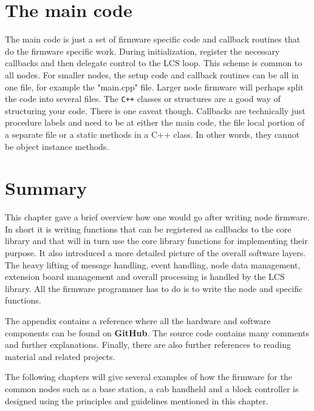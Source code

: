 \section{The main code}

The main code is just a set of firmware specific code and callback routines that do the firmware specific work. During initialization, register the necessary callbacks and then delegate control to the LCS loop. This scheme is common to all nodes. For smaller nodes, the setup code and callback routines can be all in one file, for example the "main.cpp" file. Larger node firmware will perhaps split the code into several files. The \texttt{C++} classes or structures are a good way of structuring your code. There is one caveat though. Callbacks are technically just procedure labels and need to be at either the main code, the file local portion of a separate file or a static methods in a C++ class. In other words, they cannot be object instance methods.

\section{Summary}

This chapter gave a brief overview how one would go after writing node firmware. In short it is writing functions that can be registered as callbacks to the core library and that will in turn use the core library functions for implementing their purpose. It also introduced a more detailed picture of the overall software layers. The heavy lifting of message handling, event handling, node data management, extension board management and overall processing is handled by the LCS library. All the firmware programmer has to do is to write the node and specific functions. 

The appendix contains a reference where all the hardware and software components can be found on \textbf{GitHub}. The source code contains many comments and further explanations. Finally, there are also further references to reading material and related projects.

The following chapters will give several examples of how the firmware for the common nodes such as a base station, a cab handheld and a block controller is designed using the principles and guidelines mentioned in this chapter.

